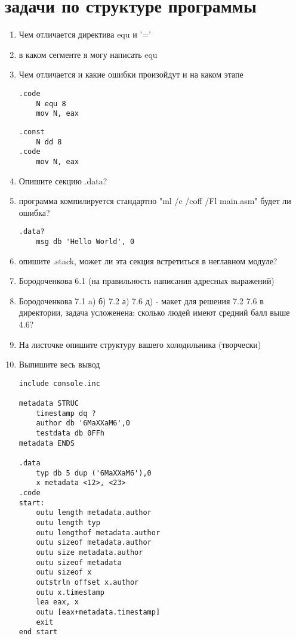 \documentclass[a4paper,10pt]{article}
\begin{document}
\section*{задачи по структуре программы}
\begin{enumerate}
    \item Чем отличается директива equ и '='
    \item в каком сегменте я могу написать equ
    \item Чем отличается и какие ошибки произойдут и на каком этапе
    \begin{multicols}{2}
\begin{verbatim}
.code
    N equ 8
    mov N, eax
\end{verbatim}
        \columnbreak
\begin{verbatim}
.const
    N dd 8
.code
    mov N, eax
\end{verbatim}
    \end{multicols}
    \item Опишите секцию .data?
    \item программа компилируется стандартно "ml /c /coff /Fl main.asm" будет ли ошибка?
\begin{verbatim}
.data?
    msg db 'Hello World', 0
\end{verbatim}
    \item опишите .stack, может ли эта секция встретиться в неглавном модуле?
    \item Бородоченкова 6.1 (на правильность написания адресных выражений)
    \item Бородоченкова 7.1 a) б) 7.2 а) 7.6 д) - макет для решения 7.2 7.6 в директории, задача усложенена: сколько людей имеют средний балл выше 4.6?
    \item На листочке опишите структуру вашего холодильника (творчески)
    \item Выпишите весь вывод
\begin{verbatim}
include console.inc

metadata STRUC
    timestamp dq ?
    author db '6MaXXaM6',0
    testdata db 0FFh
metadata ENDS

.data
    typ db 5 dup ('6MaXXaM6'),0
    x metadata <12>, <23>
.code
start: 
    outu length metadata.author
    outu length typ
    outu lengthof metadata.author
    outu sizeof metadata.author
    outu size metadata.author
    outu sizeof metadata
    outu sizeof x
    outstrln offset x.author
    outu x.timestamp
    lea eax, x
    outu [eax+metadata.timestamp]
    exit
end start
\end{verbatim}
\end{enumerate}
\end{document}

